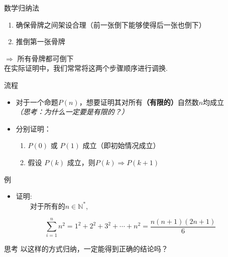 \documentclass[]{beamer}
\begin{document}
\begin{frame}{数学归纳法}
    \begin{enumerate}
        \item 确保骨牌之间架设合理（前一张倒下能够使得后一张也倒下）
        \item 推倒第一张骨牌
    \end{enumerate}
    \(\Rightarrow\) 所有骨牌都可倒下\\
    \vspace{5pt}
    在实际证明中，我们常常将这两个步骤顺序进行调换.
\end{frame}

\begin{frame}{流程}
    \begin{itemize}
        \item 对于一个命题\(P(n)\)，想要证明其对所有\textbf{（有限的）}自然数$n$均成立\\
        \textit{（思考：为什么一定要是有限的？）}
        \item 分别证明：
        \begin{enumerate}
            \item $P(0)$ 或 $P(1)$ 成立（即初始情况成立）
            \item 假设 $P(k)$ 成立，则\(P(k)\Rightarrow P(k+1)\)
        \end{enumerate}
    \end{itemize}
\end{frame}

\begin{frame}{例}
    \begin{itemize}
        \item 证明:\\
    \ \ \ \ 对于所有的\(n\in\mathbb{N}^*\),
    \end{itemize}
    \[
    \sum_{i=1}^nn^2=1^2+2^2+3^2+\cdots+n^2=\frac{n(n+1)(2n+1)}{6}
    \]
    
\end{frame}

\begin{frame}{思考}
    \hspace{2em}以这样的方式归纳，一定能得到正确的结论吗？
\end{frame}
\end{document}
